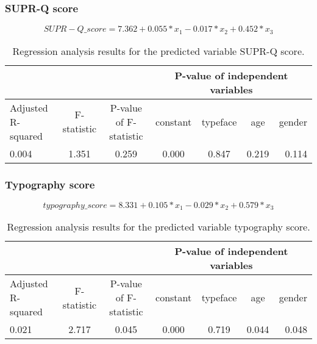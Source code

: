\documentclass{article}
\begin{document}
\subsubsection*{SUPR-Q score}
\begin{equation}
SUPR-Q\_score = 7.362 + 0.055 * x_1 - 0.017 * x_2 + 0.452 * x_3
\label{eq:suprqscoreregression}
\end{equation}
\begin{table}[H]
\centering
\begin{tabular}{ l|c|c|c|c|c|r } 
    \multicolumn{3}{c}{} &
     \multicolumn{4}{c}{\textbf{P-value of independent variables}} \\
    \hline
     Adjusted R-squared & F-statistic & P-value of F-statistic & constant & typeface & age & gender \\
     0.004 & 1.351 & 0.259 & 0.000 & 0.847 & 0.219 & 0.114\\
\end{tabular}
\caption{\label{tab:suprqscoretable}Regression analysis results for the predicted variable SUPR-Q score.}
\end{table}

\subsubsection*{Typography score}
\begin{equation}
typography\_score = 8.331 +  0.105 * x_1 - 0.029 * x_2 + 0.579 * x_3
\label{eq:typographyscoreregression}
\end{equation}
\begin{table}[H]
\centering
\begin{tabular}{ l|c|c|c|c|c|r } 
    \multicolumn{3}{c}{} &
     \multicolumn{4}{c}{\textbf{P-value of independent variables}} \\
    \hline
     Adjusted R-squared & F-statistic & P-value of F-statistic & constant & typeface & age & gender \\
     0.021 & 2.717 & 0.045 & 0.000 & 0.719 & 0.044 & 0.048\\
\end{tabular}
\caption{\label{tab:typographyscoretable}Regression analysis results for the predicted variable typography score.}
\end{table}
\end{document}
